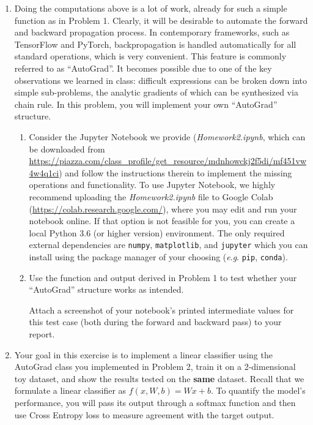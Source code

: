 \documentclass[a4paper]{article}
\begin{document}
\begin{enumerate}
\item Doing the computations above is a lot of work, already for such a simple function as in Problem 1. 
% 
Clearly, it will be desirable to automate the forward and backward propagation process. 
% 
In contemporary frameworks, such as TensorFlow and PyTorch, backpropagation is handled automatically for all standard operations, which is very convenient. 
% 
This feature is commonly referred to as ``AutoGrad''. 
% 
It becomes possible due to one of the key observations we learned in class: difficult expressions can be broken down into simple sub-problems, the analytic gradients of which can be synthesized via chain rule. 
% 
In this problem, you will implement your own ``AutoGrad'' structure.
% 
\begin{enumerate}
\item 
Consider the Jupyter Notebook we provide (\textit{Homework2.ipynb}, which can be downloaded from \url{https://piazza.com/class_profile/get_resource/mdnhowckj2f5di/mf451vw4w4q1ci}) and follow the instructions therein to implement the missing operations and functionality. 
% 
To use Jupyter Notebook, we highly recommend uploading the \textit{Homework2.ipynb} file to Google Colab (\url{https://colab.research.google.com/}), where you may edit and run your notebook online. 
% 
If that option is not feasible for you, you can create a local Python 3.6 (or higher version) environment. 
% 
The only required external dependencies are \texttt{numpy}, \texttt{matplotlib}, and \texttt{jupyter} which you can install using the package manager of your choosing (\textit{e}.\textit{g}. \texttt{pip}, \texttt{conda}).
% 
\item Use the function and output derived in Problem 1 to test whether your ``AutoGrad'' structure works as intended. 


Attach a screenshot of your notebook's printed intermediate values for this test case (both during the forward and backward pass) to your report.

\end{enumerate}

	
\item 
Your goal in this exercise is to implement a linear classifier using the AutoGrad class you implemented in Problem 2, train it on a 2-dimensional toy dataset, and show the results tested on the {\bf same} dataset.
Recall that we formulate a linear classifier as $f(x, W, b) = Wx + b$. To quantify the model's performance, you will pass its output through a softmax function and then use Cross Entropy loss to measure agreement with the target output.\\


\end{enumerate}
\end{document}
